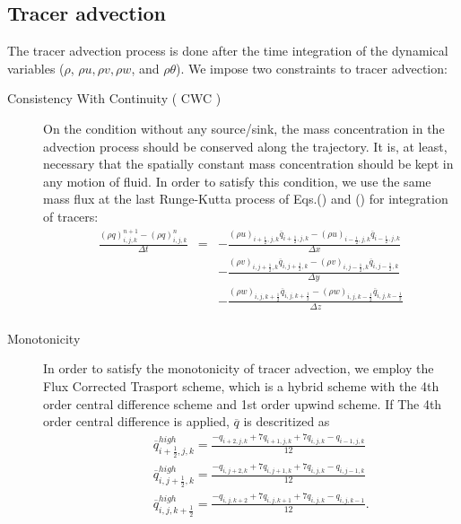 \subsection{Tracer advection}
The tracer advection process is done after the time integration of 
the dynamical variables ($\rho$, $\rho u,\rho v,\rho w$, and $\rho \theta$).
We impose two constraints to tracer advection:
\begin{description}
\item[Consistency With Continuity ( CWC )]
On the condition without any source/sink,
the mass concentration in the advection process 
should be conserved along the trajectory.
It is, at least,  necessary that 
the spatially constant mass concentration should be kept
in any motion of fluid.
In order to satisfy this condition, we use the same mass flux at the last Runge-Kutta
process of Eqs.() and () for integration of tracers:
\begin{eqnarray}
\frac{\left(\rho q\right)^{n+1}_{i,j,k} - \left(\rho q\right)^{n}_{i,j,k}}{\Delta t}
&=& - \frac{(\rho u)_{i+\frac{1}{2},j,k} \overline{q}_{i+\frac{1}{2},j,k} 
           -(\rho u)_{i-\frac{1}{2},j,k} \overline{q}_{i-\frac{1}{2},j,k}}
     {\Delta x}\nonumber\\
& &  - \frac{(\rho v)_{i,j+\frac{1}{2},k} \overline{q}_{i,j+\frac{1}{2},k} 
           -(\rho v)_{i,j-\frac{1}{2},k} \overline{q}_{i,j-\frac{1}{2},k}}
     {\Delta y}\nonumber\\
& &  - \frac{(\rho w)_{i,j,k+\frac{1}{2}} \overline{q}_{i,j,k+\frac{1}{2}} 
           -(\rho w)_{i,j,k-\frac{1}{2}} \overline{q}_{i,j,k-\frac{1}{2}}}
     {\Delta z}\nonumber\\
\label{eq:tracer_int}
\end{eqnarray}
\item[Monotonicity]
In order to satisfy the monotonicity of tracer advection,
we employ the Flux Corrected Trasport scheme, which is a hybrid scheme 
with the 4th order central difference scheme and 1st order upwind scheme.
If The 4th order central difference is applied, 
$\overline{q}$ is descritized as
\begin{eqnarray}
&& \overline{q}_{i+\frac{1}{2},j,k}^{high} = 
\frac{-q_{i+2,j,k}+7q_{i+1,j,k}+7q_{i,j,k}-q_{i-1,j,k}}{12}\\
&& \overline{q}_{i,j+\frac{1}{2},k}^{high} = 
\frac{-q_{i,j+2,k}+7q_{i,j+1,k}+7q_{i,j,k}-q_{i,j-1,k}}{12}\\
&& \overline{q}_{i,j,k+\frac{1}{2}}^{high} = 
\frac{-q_{i,j,k+2}+7q_{i,j,k+1}+7q_{i,j,k}-q_{i,j,k-1}}{12}.
\end{eqnarray}

\end{description}
